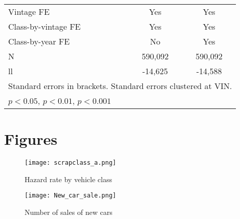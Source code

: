 \begin{longtable}{lcc}
Vintage FE          &         Yes         &         Yes         \tabularnewline
Class-by-vintage FE          &         Yes         &         Yes         \tabularnewline
Class-by-year FE          &         No         &         Yes         \tabularnewline
\hline
N                   &      590,092         &      590,092         \tabularnewline
ll                  &    -14,625         &    -14,588         \tabularnewline
\hline\hline
\multicolumn{3}{l}{\footnotesize Standard errors in brackets. Standard errors clustered at VIN.}\tabularnewline
\multicolumn{3}{l}{\footnotesize \sym{*} \(p<0.05\), \sym{**} \(p<0.01\), \sym{***} \(p<0.001\)}\tabularnewline
\end{longtable}

\section{Figures}

\begin{figure}[!htb]
\centering
\texttt{[image: scrapclass\_a.png]} 
\caption{Hazard rate by vehicle class}
\label{fig:classscrap_a}
\end{figure}

\begin{figure}[!htb]
\centering
\texttt{[image: New\_car\_sale.png]} 
\caption{Number of sales of new cars}
\label{fig:newcar}
\end{figure}

